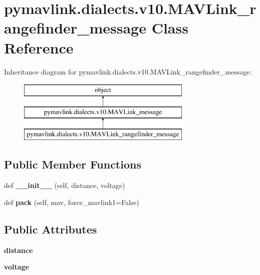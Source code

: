 \hypertarget{classpymavlink_1_1dialects_1_1v10_1_1MAVLink__rangefinder__message}{}\section{pymavlink.\+dialects.\+v10.\+M\+A\+V\+Link\+\_\+rangefinder\+\_\+message Class Reference}
\label{classpymavlink_1_1dialects_1_1v10_1_1MAVLink__rangefinder__message}
Inheritance diagram for pymavlink.\+dialects.\+v10.\+M\+A\+V\+Link\+\_\+rangefinder\+\_\+message\+:\begin{figure}[H]
\begin{center}
\leavevmode
\includegraphics[height=3.000000cm]{classpymavlink_1_1dialects_1_1v10_1_1MAVLink__rangefinder__message}
\end{center}
\end{figure}
\subsection*{Public Member Functions}
\begin{DoxyCompactItemize}
\item 
\mbox{\label{classpymavlink_1_1dialects_1_1v10_1_1MAVLink__rangefinder__message_aa35a8c87b1b29cbb07964311633469d7}} 
def {\bfseries \+\_\+\+\_\+init\+\_\+\+\_\+} (self, distance, voltage)
\item 
\mbox{\label{classpymavlink_1_1dialects_1_1v10_1_1MAVLink__rangefinder__message_af5aa20ebff1633a7eb3095f2f40cda7d}} 
def {\bfseries pack} (self, mav, force\+\_\+mavlink1=False)
\end{DoxyCompactItemize}
\subsection*{Public Attributes}
\begin{DoxyCompactItemize}
\item 
\mbox{\label{classpymavlink_1_1dialects_1_1v10_1_1MAVLink__rangefinder__message_a1c9951d0635b6a704fca907e3aad5c06}} 
{\bfseries distance}
\item 
\mbox{\label{classpymavlink_1_1dialects_1_1v10_1_1MAVLink__rangefinder__message_a34fdc8a3eea23a0f26267a2196b9aaec}} 
{\bfseries voltage}
\end{DoxyCompactItemize}
